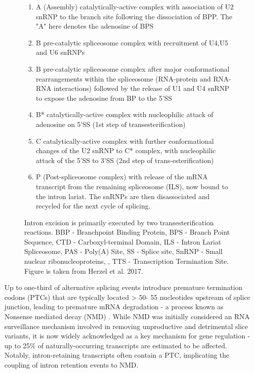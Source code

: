 \begin{figure}[!htp]
{\begin{enumerate}
			\item A (Assembly) catalytically-active complex with association of U2 snRNP to the branch site following the dissociation of BPP. The "A" here denotes the adenosine of BPS
			\item B pre-catalytic spliceosome complex with recruitment of U4,U5 and U6 snRNPs
			\item B pre-catalytic spliceosome complex after major conformational rearrangements within the spliceosome (RNA-protein and RNA-RNA interactions) followed by the release of U1 and U4 snRNP to expose the adenosine from BP to the 5'SS 
			\item B* catalytically-active complex with nucleophilic attack of adenosine on 5'SS (1st step of transesterification) 
			\item C catalytically-active complex with further conformational changes of the U2 snRNP to C* complex, with nucleophilic attack of the 5'SS to 3'SS (2nd step of trans-esterification) 
			\item P (Post-spliceosome complex) with release of the mRNA transcript from the remaining spliceosome (ILS), now bound to the intron lariat. The snRNPs are then disassociated and recycled for the next cycle of splicing.
			\\
		\end{enumerate} 
		Intron excision is primarily executed by two transesterification reactions. BBP - Branchpoint Binding Protein, BPS - Branch Point Sequence, CTD - Carboxyl-terminal Domain, ILS - Intron Lariat Spliceosome, PAS - Poly(A) Site, SS - Splice site, SnRNP - Small nuclear ribonucleoproteins, , TTS - Transcription Termination Site. Figure is taken from Herzel et al. 2017\cite{Herzel2017}.
	}
	\label{fig:AS_mechanism}
\end{figure}

\vspace{1.5cm}
Up to one-third of alternative splicing events introduce premature termination codons (PTCs) that are typically located > 50- 55 nucleotides upstream of splice junction, leading to premature mRNA degradation - a process known as Nonsense mediated decay (NMD)\cite{Lewis2003} . While NMD was initially considered an RNA surveillance mechanism involved in removing unproductive and detrimental slice variants, it is now widely acknowledged as a key mechanism for gene regulation\cite{Nickless2017} - up to 25\% of naturally-occurring transcripts are estimated to be affected\cite{Weischenfeldt2012}. Notably, intron-retaining transcripts often contain a PTC, implicating the coupling of intron retention events to NMD\cite{Wong2013}.     

